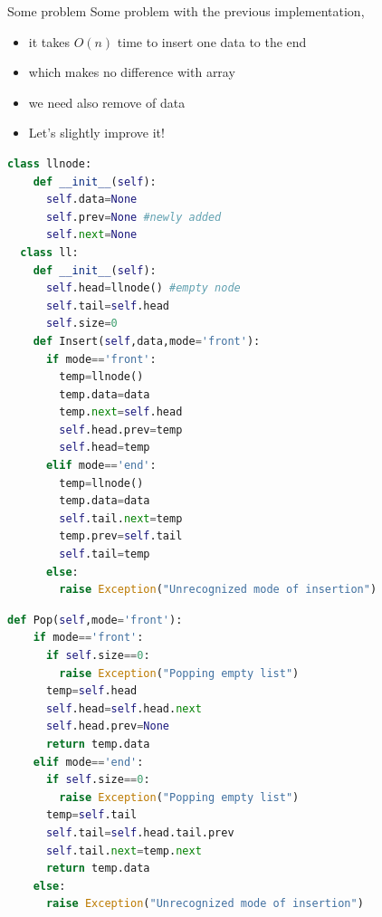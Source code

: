 \documentclass[10pt,xcolor={table,dvipsnames},t]{beamer}
\begin{document}
\begin{frame}{Some problem}
  Some problem with the previous implementation,
  \begin{itemize}
    \item it takes $O(n)$ time to insert one data to the end
    \item which makes no difference with array
    \item we need also remove of data
    \item Let's slightly improve it!
  \end{itemize}
\end{frame}

\begin{frame}[fragile]
\begin{lstlisting}[language=python]
  class llnode:
    def __init__(self):
      self.data=None
      self.prev=None #newly added
      self.next=None
  class ll:
    def __init__(self):
      self.head=llnode() #empty node
      self.tail=self.head
      self.size=0
    def Insert(self,data,mode='front'):
      if mode=='front':
        temp=llnode()
        temp.data=data
        temp.next=self.head
        self.head.prev=temp
        self.head=temp
      elif mode=='end':
        temp=llnode()
        temp.data=data
        self.tail.next=temp
        temp.prev=self.tail
        self.tail=temp
      else:
        raise Exception("Unrecognized mode of insertion")
\end{lstlisting}
\end{frame}

\begin{frame}[fragile]
\begin{lstlisting}[language=python]
  def Pop(self,mode='front'):
    if mode=='front':
      if self.size==0:
        raise Exception("Popping empty list")
      temp=self.head
      self.head=self.head.next
      self.head.prev=None
      return temp.data
    elif mode=='end':
      if self.size==0:
        raise Exception("Popping empty list")
      temp=self.tail
      self.tail=self.head.tail.prev
      self.tail.next=temp.next
      return temp.data
    else:
      raise Exception("Unrecognized mode of insertion")
\end{lstlisting}
\end{frame}
\end{document}
